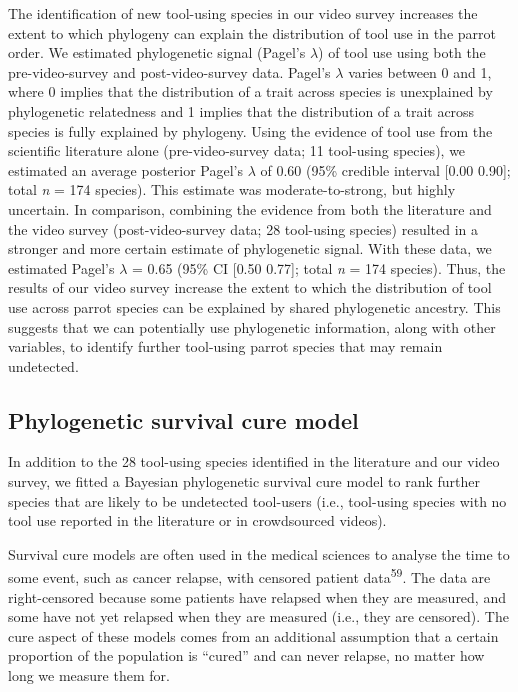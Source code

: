 \documentclass[
  man,floatsintext]{apa6}
\begin{document}
The identification of new tool-using species in our video survey increases the extent to which phylogeny can explain the distribution of tool use in the parrot order. We estimated phylogenetic signal (Pagel's \(\lambda\)) of tool use using both the pre-video-survey and post-video-survey data. Pagel's \(\lambda\) varies between 0 and 1, where 0 implies that the distribution of a trait across species is unexplained by phylogenetic relatedness and 1 implies that the distribution of a trait across species is fully explained by phylogeny. Using the evidence of tool use from the scientific literature alone (pre-video-survey data; 11 tool-using species), we estimated an average posterior Pagel's \(\lambda\) of 0.60 (95\% credible interval {[}0.00 0.90{]}; total \emph{n} = 174 species). This estimate was moderate-to-strong, but highly uncertain. In comparison, combining the evidence from both the literature and the video survey (post-video-survey data; 28 tool-using species) resulted in a stronger and more certain estimate of phylogenetic signal. With these data, we estimated Pagel's \(\lambda\) = 0.65 (95\% CI {[}0.50 0.77{]}; total \emph{n} = 174 species). Thus, the results of our video survey increase the extent to which the distribution of tool use across parrot species can be explained by shared phylogenetic ancestry. This suggests that we can potentially use phylogenetic information, along with other variables, to identify further tool-using parrot species that may remain undetected.

\hypertarget{phylogenetic-survival-cure-model}{%
\subsection{Phylogenetic survival cure model}\label{phylogenetic-survival-cure-model}}

In addition to the 28 tool-using species identified in the literature and our video survey, we fitted a Bayesian phylogenetic survival cure model to rank further species that are likely to be undetected tool-users (i.e., tool-using species with no tool use reported in the literature or in crowdsourced videos).

Survival cure models are often used in the medical sciences to analyse the time to some event, such as cancer relapse, with censored patient data\textsuperscript{59}. The data are right-censored because some patients have relapsed when they are measured, and some have not yet relapsed when they are measured (i.e., they are censored). The cure aspect of these models comes from an additional assumption that a certain proportion of the population is ``cured'' and can never relapse, no matter how long we measure them for.
\end{document}

